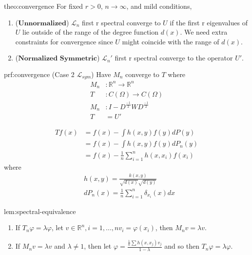 \documentclass[12pt]{article}
\theoremstyle{plain}
\begin{document}
\begin{theo}[Convergence]{theo:convergence}
For fixed $r > 0$, $n \rightarrow \infty$, and mild conditions,
	\begin{enumerate}
	\item ($\textbf{Unnormalized}$) $\mathcal{L}_n$ first r spectral converge to $ U $ if the first r eigenvalues of $ U $ lie outside of the range of the degree function $ d(x) $. We need extra constraints for convergence since $ U $ might coincide with the range of $ d(x) $.
	\item ($\textbf{Normalized Symmetric}$) $\mathcal{L}_n'$ first r spectral converge to the operator $ U' $.
	\end{enumerate}
\end{theo}

\begin{prf}{prf:convergence}
(Case 2 $\mathcal{L}_{sym}$) Have $M_n$ converge to $T$ where
	\begin{align*}
		M_n &: \mathbb{R}^n \rightarrow \mathbb{R}^n \\
		T &: C(\Omega) \rightarrow C(\Omega) \\
		M_n &: I-D^{\frac{-1}{2}}WD^{\frac{-1}{2}} \\
		T &= U'
	\end{align*}

	\begin{align*}
	Tf(x) &= f(x) - \int h(x,y)f(y)dP(y) \\
	&= f(x) - \int h(x,y)f(y)dP_n(y) \\
	&= f(x) - \frac{1}{n} \sum_{i=1}^n h(x,x_i)f(x_i)
	\end{align*}
	where
	\begin{align*}
	&h(x,y) = \frac{k(x,y)}{\sqrt{d(x)}\sqrt{d(y)}} \\
	&dP_n(x) = \frac{1}{n} \sum_{i=1}^n \delta_{x_i}(x) dx
	\end{align*}

\end{prf}

\begin{lem}{lem:spectral-equivalence}
	\begin{enumerate}
	\item If $T_n \varphi = \lambda \varphi$, let $v \in \mathbb{R}^n, i = 1,...,n v_i = \varphi(x_i)$, then $M_nv = \lambda v$.
	\item If $M_nv = \lambda v$ and $\lambda \neq 1$, then let $\varphi = \frac{\frac{1}{n} \sum h(x,x_j)v_j}{1-\lambda}$ and so then $T_n\varphi = \lambda\varphi$.
	\end{enumerate}
\end{lem}
\end{document}
